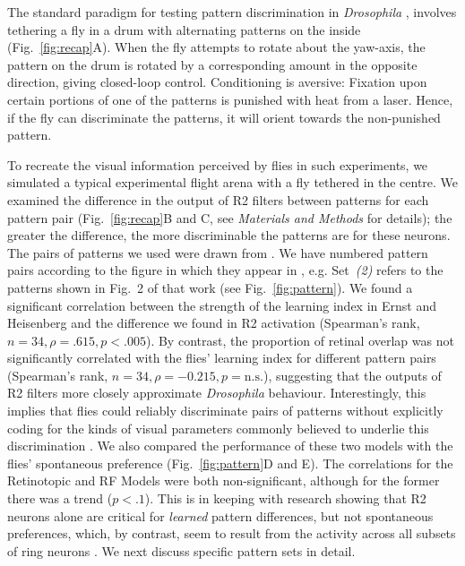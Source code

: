 The standard paradigm for testing pattern discrimination in \emph{Drosophila} \cite{Pan2009,Liu2006,Ernst1999,Dill1993}, involves tethering a fly in a drum with alternating patterns on the inside (Fig.~\ref{fig:recap}A).
When the fly attempts to rotate about the yaw-axis, the pattern on the drum is rotated by a corresponding amount in the opposite direction, giving closed-loop control.
Conditioning is aversive: Fixation upon certain portions of one of the patterns is punished with heat from a laser.
Hence, if the fly can discriminate the patterns, it will orient towards the non-punished pattern.

To recreate the visual information perceived by flies in such experiments, we simulated a typical experimental flight arena with a fly tethered in the centre.
We examined the difference in the output of R2 filters between patterns for each pattern pair (Fig.~\ref{fig:recap}B and C, see \emph{Materials and Methods} for details); the greater the difference, the more discriminable the patterns are for these neurons.
The pairs of patterns we used were drawn from \cite{Ernst1999}.
We have numbered pattern pairs according to the figure in which they appear in \cite{Ernst1999}, e.g. Set~\emph{(2)} refers to the patterns shown in Fig.~2 of that work (see Fig.~\ref{fig:pattern}).
We found a significant correlation between the strength of the learning index in Ernst and Heisenberg \cite{Ernst1999} and the difference we found in R2 activation (Spearman's rank, $n=34, \rho=.615, p<.005$).
By contrast, the proportion of retinal overlap was not significantly correlated with the flies' learning index for different pattern pairs (Spearman's rank, $n=34, \rho= -0.215, p=\mathrm{n.s.}$), suggesting that the outputs of R2 filters more closely approximate \emph{Drosophila} behaviour.
Interestingly, this implies that flies could reliably discriminate pairs of patterns without explicitly coding for the kinds of visual parameters commonly believed to underlie this discrimination \cite{Pan2009,Liu2006,Ernst1999}.
We also compared the performance of these two models with the flies' spontaneous preference (Fig.~\ref{fig:pattern}D and E).
The correlations for the Retinotopic and RF Models were both non-significant, although for the former there was a trend ($p<.1$).
This is in keeping with research showing that R2 neurons alone are critical for \emph{learned} pattern differences, but not spontaneous preferences, which, by contrast, seem to result from the activity across all subsets of ring neurons \texthl{[cit]}.
We next discuss specific pattern sets in detail.

